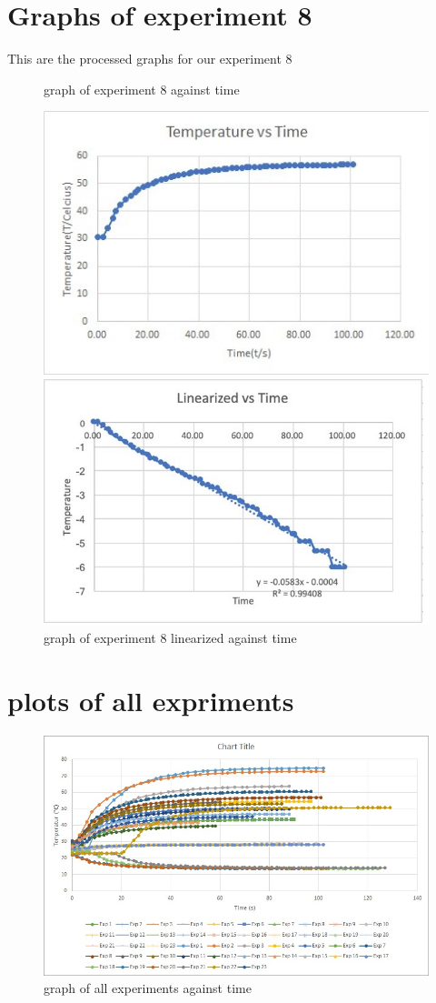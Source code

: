 \documentclass[10pt]{article}
\begin{document}
\begin{appendices}
\section{Graphs of experiment 8}
This are the processed graphs for our experiment 8
\begin{figure}[h]
\caption{graph of experiment 8 against time}
\includegraphics{4}
\caption{graph of experiment 8 linearized against time}
\includegraphics{5}
\end{figure}
\newpage
\section{plots of all expriments}
\begin{figure}[h]
\caption{graph of all experiments against time}
\includegraphics[scale=0.5]{6}
\end{figure}
\newpage

\end{appendices}
\end{document}
